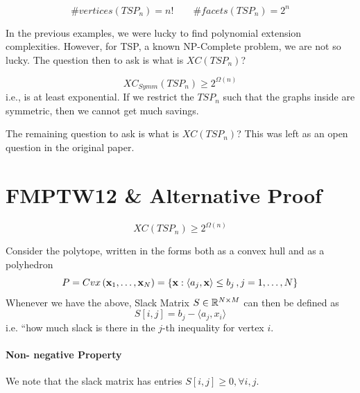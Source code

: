 \begin{proposition}
	\begin{equation}
		\# vertices (TSP_n) = n! \quad \quad \# facets (TSP_n) = 2^n
	\end{equation}
\end{proposition}
 
In the previous examples, we were lucky to find polynomial extension complexities. However, for TSP, a known NP-Complete problem, we are not so lucky. The question then to ask is what is $XC(TSP_n)$? 

\begin{theorem}
	\begin{equation}
		XC_{Symm} (TSP_n) \geq 2^{\Omega(n)}
	\end{equation}
	i.e., is at least exponential. If we restrict the $TSP_n$ such that the graphs inside are symmetric, then we cannot get much savings. 
\end{theorem}

The remaining question to ask is what is $XC(TSP_n)$? This was left as an open question in the original paper. 

\section{FMPTW12 \& Alternative Proof}
\begin{theorem}
	\begin{equation}
		XC(TSP_n) \geq 2 ^{\Omega (n)}
	\end{equation}
	\label{thm:FMPTW12}
\end{theorem}

\begin{definition}
	Consider the polytope, written in the forms both as a convex hull and as a polyhedron
	\begin{equation}
		P = Cvx\left( \mathbf{x}_1, \dots, \mathbf{x}_N \right) = \{\mathbf{x}: \langle a_j , \mathbf{x} \rangle \leq b_j\,, j = 1, \dots, N \} 
	\end{equation}
	Whenever we have the above, Slack Matrix $S \in \mathbb{R}^{N \times M}$ can then be defined as 
	\begin{equation}
		S[i,j] = b_j - \langle a_j , x_i \rangle
	\end{equation}
	i.e. ``how much slack is there in the $j$-th inequality for vertex $i$. 
	
	\paragraph{Non- negative Property} We note that the slack matrix has entries $S[i, j] \geq 0, \forall i, j$. 
\end{definition}

